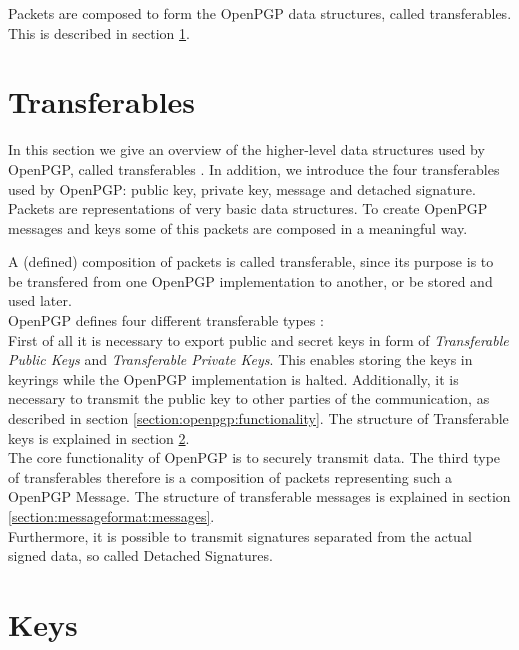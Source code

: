 Packets are composed to form the OpenPGP data structures, called transferables. This is described in section \ref{section:messageformat:transferables}. \\

\section{Transferables}
\label{section:messageformat:transferables}

In this section we give an overview of the higher-level data structures used by OpenPGP, called transferables \cite[section 11]{RFC4880}. In addition, we introduce the four transferables used by OpenPGP: public key, private key, message and detached signature.  \\

Packets are representations of very basic data structures. To create OpenPGP messages and keys some of this packets are composed in a meaningful way.

A (defined) composition of packets is called transferable, since its purpose is to be transfered from one OpenPGP implementation to another, or be stored and used later. \\

OpenPGP defines four different transferable types \cite[section 11]{RFC4880}: \\

First of all it is necessary to export public and secret keys in form of \textit{Transferable Public Keys} and \textit{Transferable Private Keys}. This enables storing the keys in keyrings while the OpenPGP implementation is halted. Additionally, it is necessary to transmit the public key to other parties of the communication, as described in section \ref{section:openpgp:functionality}. The structure of Transferable keys is explained in section \ref{section:messageformat:keys}.  \\

The core functionality of OpenPGP is to securely transmit data. The third type of transferables therefore is a composition of packets representing such a OpenPGP Message. The structure of transferable messages is explained in section \ref{section:messageformat:messages}. \\

Furthermore, it is possible to transmit signatures separated from the actual signed data, so called Detached Signatures.

\section{Keys}
\label{section:messageformat:keys}

